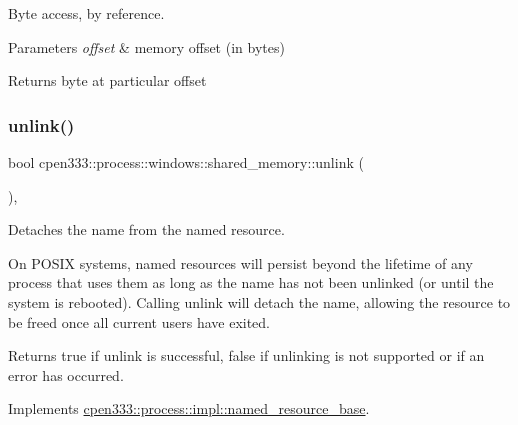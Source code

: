 Byte access, by reference. 


\begin{DoxyParams}{Parameters}
{\em offset} & memory offset (in bytes) \\
\hline
\end{DoxyParams}
\begin{DoxyReturn}{Returns}
byte at particular offset 
\end{DoxyReturn}
\mbox{\label{classcpen333_1_1process_1_1windows_1_1shared__memory_aa6efdc9a3e1310ea69ecc48aeb41286c}} 
\subsubsection{\texorpdfstring{unlink()}{unlink()}\hspace{0.1cm}{\footnotesize\ttfamily [1/2]}}
{\footnotesize\ttfamily bool cpen333\+::process\+::windows\+::shared\+\_\+memory\+::unlink (\begin{DoxyParamCaption}{ }\end{DoxyParamCaption})\hspace{0.3cm}{\ttfamily [inline]}, {\ttfamily [virtual]}}



Detaches the name from the named resource. 

On P\+O\+S\+IX systems, named resources will persist beyond the lifetime of any process that uses them as long as the name has not been unlinked (or until the system is rebooted). Calling {\ttfamily unlink} will detach the name, allowing the resource to be freed once all current users have exited.

\begin{DoxyReturn}{Returns}
{\ttfamily true} if unlink is successful, {\ttfamily false} if unlinking is not supported or if an error has occurred. 
\end{DoxyReturn}


Implements \hyperlink{classcpen333_1_1process_1_1impl_1_1named__resource__base_ae4033f82dfd068b917a9bca57d3a0c45}{cpen333\+::process\+::impl\+::named\+\_\+resource\+\_\+base}.

\mbox{\label{classcpen333_1_1process_1_1windows_1_1shared__memory_a99c4766a9995a97595bba1550256f1c9}} 
